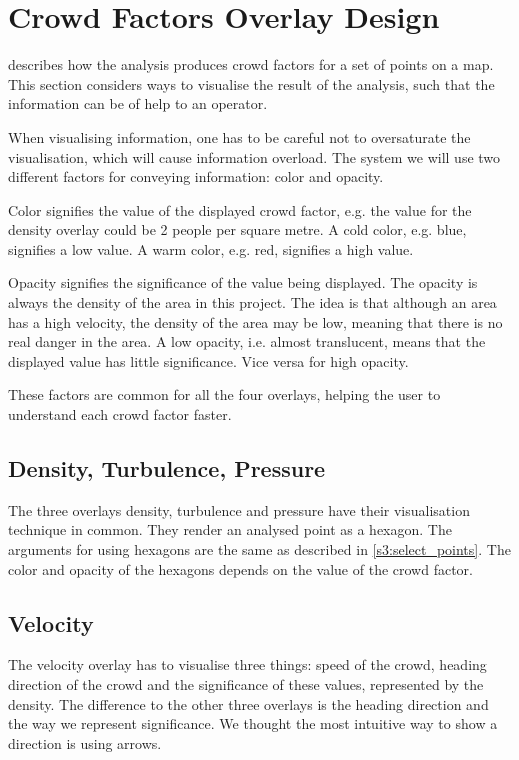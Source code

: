 \section{Crowd Factors Overlay Design} \label{sec:s4_overlay}

 describes how the analysis produces crowd factors for a set of points on a map. This section considers ways to visualise the result of the analysis, such that the information can be of help to an operator.

When visualising information, one has to be careful not to oversaturate the visualisation, which will cause information overload. The system we will use two different factors for conveying information: color and opacity. 

Color signifies the value of the displayed crowd factor, e.g. the value for the density overlay could be 2 people per square metre. A cold color, e.g. blue, signifies a low value. A warm color, e.g. red, signifies a high value. 

Opacity signifies the significance of the value being displayed. The opacity is always the density of the area in this project. The idea is that although an area has a high velocity, the density of the area may be low, meaning that there is no real danger in the area. A low opacity, i.e. almost translucent, means that the displayed value has little significance. Vice versa for high opacity. 

These factors are common for all the four overlays, helping the user to understand each crowd factor faster.

\subsection{Density, Turbulence, Pressure}
The three overlays density, turbulence and pressure have their visualisation technique in common. They render an analysed point as a hexagon. The arguments for using hexagons are the same as described in \cref{s3:select_points}. The color and opacity of the hexagons depends on the value of the crowd factor.

\subsection{Velocity}
The velocity overlay has to visualise three things: speed of the crowd, heading direction of the crowd and the significance of these values, represented by the density. The difference to the other three overlays is the heading direction and the way we represent significance. We thought the most intuitive way to show a direction is using arrows. 

